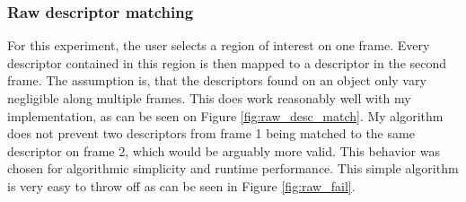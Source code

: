\documentclass{paper}
\begin{document}
\subsubsection{Raw descriptor matching}
\label{sec:raw}
For this experiment, the user selects a region of interest on one frame. Every 
descriptor contained in this region is then mapped to a descriptor in the second frame.
The assumption is, that the descriptors found on an object only vary negligible along
multiple frames. This does work reasonably well with my implementation, as can be seen
on Figure \ref{fig:raw_desc_match}. My algorithm does not prevent two descriptors from
frame 1 being matched to the same descriptor on frame 2, which would be arguably more
valid. This behavior was chosen for algorithmic simplicity and runtime performance. 
This simple algorithm is very easy to throw off as can be seen in Figure \ref{fig:raw_fail}.
\end{document}
